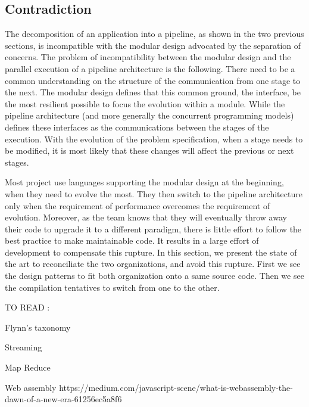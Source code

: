 \subsection{Contradiction}

The decomposition of an application into a pipeline, as shown in the two previous sections, is incompatible with the modular design advocated by the separation of concerns.
The problem of incompatibility between the modular design and the parallel execution of a pipeline architecture is the following.
There need to be a common understanding on the structure of the communication from one stage to the next.
The modular design defines that this common ground, the interface, be the most resilient possible to focus the evolution within a module.
While the pipeline architecture (and more generally the concurrent programming models) defines these interfaces as the communications between the stages of the execution.
With the evolution of the problem specification, when a stage needs to be modified, it is most likely that these changes will affect the previous or next stages.

Most project use languages supporting the modular design at the beginning, when they need to evolve the most.
They then switch to the pipeline architecture only when the requirement of performance overcomes the requirement of evolution.
Moreover, as the team knows that they will eventually throw away their code to upgrade it to a different paradigm, there is little effort to follow the best practice to make maintainable code.
It results in a large effort of development to compensate this rupture.
In this section, we present the state of the art to reconciliate the two organizations, and avoid this rupture.
First we see the design patterns to fit both organization onto a same source code.
Then we see the compilation tentatives to switch from one to the other.










TO READ :

Flynn's taxonomy
\cite{Flynn1972}

Streaming
\cite{Madsen2015}
\cite{Sun2015}

Map Reduce
\cite{Yao2015}


Web assembly
https://medium.com/javascript-scene/what-is-webassembly-the-dawn-of-a-new-era-61256ec5a8f6